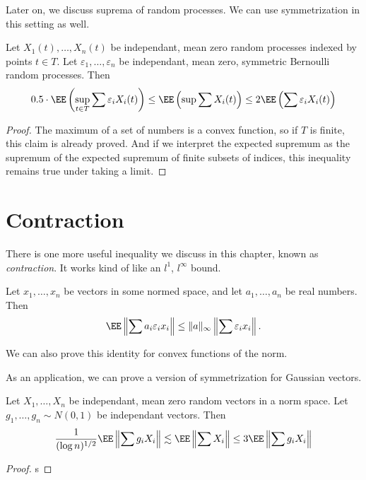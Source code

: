 Later on, we discuss suprema of random processes. We can use symmetrization in this setting as well.

\begin{lemma}
    Let $X_1(t), \dots, X_n(t)$ be independant, mean zero random processes indexed by points $t \in T$. Let $\varepsilon_1, \dots, \varepsilon_n$ be independant, mean zero, symmetric Bernoulli random processes. Then
    \[ 0.5 \cdot \EE \left( \sup_{t \in T} \sum \varepsilon_i X_i(t) \right) \leq \EE \left( \sup \sum X_i(t) \right) \leq 2 \EE \left( \sum \varepsilon_i X_i(t) \right) \]
\end{lemma}
\begin{proof}
	The maximum of a set of numbers is a convex function, so if $T$ is finite, this claim is already proved. And if we interpret the expected supremum as the supremum of the expected supremum of finite subsets of indices, this inequality remains true under taking a limit.
\end{proof}







\section{Contraction}

There is one more useful inequality we discuss in this chapter, known as \emph{ contraction}. It works kind of like an $l^1$, $l^\infty$ bound.

\begin{theorem}
    Let $x_1, \dots, x_n$ be vectors in some normed space, and let $a_1, \dots, a_n$ be real numbers. Then
    \[ \EE \left\| \sum a_i \varepsilon_i x_i \right\| \leq \| a \|_\infty \left\| \sum \varepsilon_i x_i \right\|. \]
\end{theorem}

\begin{remark}
    We can also prove this identity for convex functions of the norm.
\end{remark}

As an application, we can prove a version of symmetrization for Gaussian vectors.

\begin{theorem}
    Let $X_1, \dots, X_n$ be independant, mean zero random vectors in a norm space. Let $g_1, \dots, g_n \sim N(0,1)$ be independant vectors. Then
    \[ \frac{1}{(\log n)^{1/2}} \EE \left\| \sum g_i X_i \right\| \lesssim \EE \left\| \sum X_i \right\| \leq 3 \EE \left\| \sum g_i X_i \right\| \]
\end{theorem}
\begin{proof}
    s
\end{proof}

